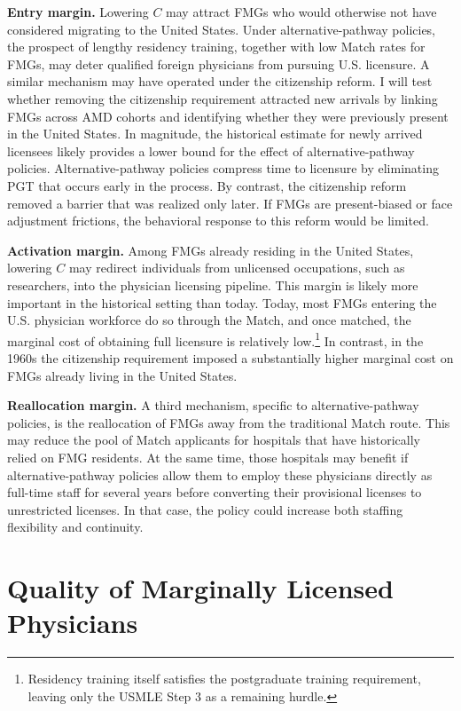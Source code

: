 \documentclass[12pt]{article}
\begin{document}
\textbf{Entry margin.} Lowering $C$ may attract FMGs who would otherwise not have considered migrating to the United States. Under alternative-pathway policies, the prospect of lengthy residency training, together with low Match rates for FMGs, may deter qualified foreign physicians from pursuing U.S. licensure. A similar mechanism may have operated under the citizenship reform. I will test whether removing the citizenship requirement attracted new arrivals by linking FMGs across AMD cohorts and identifying whether they were previously present in the United States. In magnitude, the historical estimate for newly arrived licensees likely provides a lower bound for the effect of alternative-pathway policies. Alternative-pathway policies compress time to licensure by eliminating PGT that occurs early in the process. By contrast, the citizenship reform removed a barrier that was realized only later. If FMGs are present-biased or face adjustment frictions, the behavioral response to this reform would be limited.

\textbf{Activation margin.} Among FMGs already residing in the United States, lowering $C$ may redirect individuals from unlicensed occupations, such as researchers, into the physician licensing pipeline. This margin is likely more important in the historical setting than today. Today, most FMGs entering the U.S. physician workforce do so through the Match, and once matched, the marginal cost of obtaining full licensure is relatively low.\footnote{Residency training itself satisfies the postgraduate training requirement, leaving only the USMLE Step 3 as a remaining hurdle.} In contrast, in the 1960s the citizenship requirement imposed a substantially higher marginal cost on FMGs already living in the United States. 

\textbf{Reallocation margin.} A third mechanism, specific to alternative-pathway policies, is the reallocation of FMGs away from the traditional Match route. This may reduce the pool of Match applicants for hospitals that have historically relied on FMG residents. At the same time, those hospitals may benefit if alternative-pathway policies allow them to employ these physicians directly as full-time staff for several years before converting their provisional licenses to unrestricted licenses. In that case, the policy could increase both staffing flexibility and continuity.

\section{Quality of Marginally Licensed Physicians}
\end{document}
